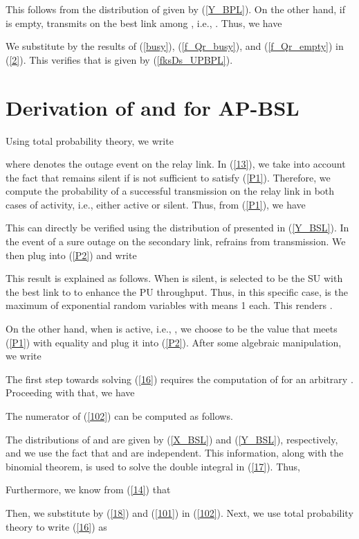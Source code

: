 \documentclass[journal,twocolumn]{IEEEtran}
\begin{document}
This follows from the distribution of  given by (\ref{Y_BPL}). On the other hand, if  is empty,  transmits on the best link among ,
i.e., . Thus, we have

We substitute by the results of (\ref{busy}), (\ref{f_Qr_busy}), and (\ref{f_Qr_empty}) in (\ref{2}). This verifies that  is given by (\ref{fksDs_UPBPL}). 





\section{Derivation of  and  for AP-BSL} \label{AP-BSL}
Using total probability theory, we write

where  denotes the outage event on the relay link. 
In (\ref{13}), we take into account the fact that  remains silent if  is not sufficient to satisfy (\ref{P1}). Therefore, we
compute the probability of a successful transmission on the relay link in both cases of  activity, i.e., either active or silent. Thus, from (\ref{P1}), we have

This can directly be verified using the distribution of  presented in (\ref{Y_BSL}). 
In the event of a sure outage on the secondary link,  refrains from transmission. 
We then plug  into (\ref{P2}) and write

This result is explained as follows. When  is silent,  is selected to be the SU with the best link to  to enhance the PU throughput. Thus, in this specific case,  is
the maximum of  exponential random variables with means 1 each. This renders .
 
On the other hand, when  is active, i.e., , we choose  to be the value that meets (\ref{P1}) with equality and plug it into (\ref{P2}). After some algebraic manipulation, we write

The first step towards solving (\ref{16}) requires the computation of  for an arbitrary . Proceeding with that, we have

The numerator of (\ref{102}) can be computed as follows.

The distributions of  and  are given by (\ref{X_BSL}) and (\ref{Y_BSL}), respectively, and we use the fact that  and  are independent. This information, along with the binomial theorem, is used to solve the double integral in (\ref{17}). Thus,

Furthermore, we know from (\ref{14}) that

Then, we substitute by (\ref{18}) and (\ref{101}) in (\ref{102}). Next,
we use total probability theory to write (\ref{16}) as
\end{document}
